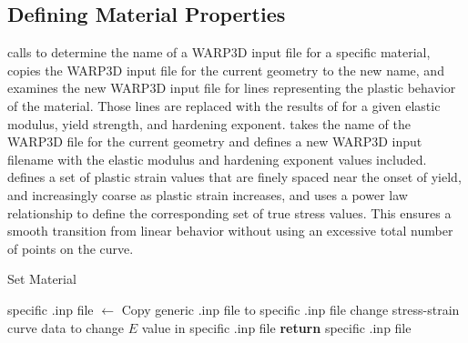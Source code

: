 \subsection{Defining Material Properties}

 calls  to determine the name of a WARP3D input file for a specific material, copies the WARP3D input file for the current geometry to the new name, and examines the new WARP3D input file for lines representing the plastic behavior of the material. Those lines are replaced with the results of  for a given elastic modulus, yield strength, and hardening exponent.
 takes the name of the WARP3D file for the current geometry and defines a new WARP3D input filename with the elastic modulus and hardening exponent values included.
 defines a set of plastic strain values that are finely spaced near the onset of yield, and increasingly coarse as plastic strain increases, and uses a power law relationship to define the corresponding set of true stress values. This ensures a smooth transition from linear behavior without using an excessive total number of points on the curve.

\begin{algorithm}[tbp]
  \caption{Set Material}
  \label{alg:set_material}
  \begin{algorithmic}
    \State {}
    \State specific .inp file $\gets$ 
    \State {}
    \State Copy generic .inp file to specific .inp file
      \State change stress-strain curve data to 
    \EndIf
    \State change $E$ value in specific .inp file
    \State \textbf{return} specific .inp file 

    \EndProcedure
  \end{algorithmic}
\end{algorithm}

